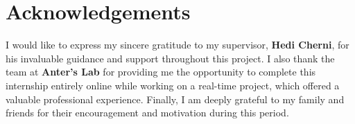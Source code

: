 \chapter*{Acknowledgements}
I would like to express my sincere gratitude to my supervisor, \textbf{Hedi Cherni}, for his invaluable guidance and support throughout this project.  
I also thank the team at \textbf{Anter's Lab} for providing me the opportunity to complete this internship entirely online while working on a real-time project, which offered a valuable professional experience.  
Finally, I am deeply grateful to my family and friends for their encouragement and motivation during this period.
